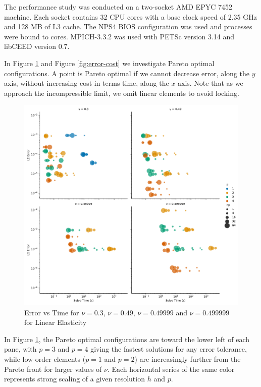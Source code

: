 The performance study was conducted on a two-socket AMD EPYC 7452 machine.
Each socket contains 32 CPU cores with a base clock speed of 2.35 GHz and 128 MB of L3 cache.
The NPS4 BIOS configuration was used and processes were bound to cores.
MPICH-3.3.2 was used with PETSc \cite{petsc-user-ref} version 3.14 and libCEED \cite{libceed} version 0.7.

In Figure \ref{fig:error-time} and Figure \ref{fig:error-cost} we investigate Pareto optimal configurations.
A point is Pareto optimal if we cannot decrease error, along the $y$ axis, without increasing cost in terms time, along the $x$ axis.
Note that as we approach the incompressible limit, we omit linear elements to avoid locking.

\begin{figure}[pbt!]
 \begin{center}
      \includegraphics[width=1\textwidth]{../img/error-time.pdf}
\end{center}
\caption{Error vs Time for $\nu = 0.3$, $\nu = 0.49$, $\nu = 0.49999$ and $\nu = 0.499999$ for Linear Elasticity}
    \label{fig:error-time}
\end{figure}

In Figure \ref{fig:error-time}, the Pareto optimal configurations are toward the lower left of each pane, with $p = 3$ and $p = 4$ giving the fastest solutions for any error tolerance, while low-order elements ($p = 1$ and $p = 2$) are increasingly further from the Pareto front for larger values of $\nu$.
Each horizontal series of the same color represents strong scaling of a given resolution $h$ and $p$.

